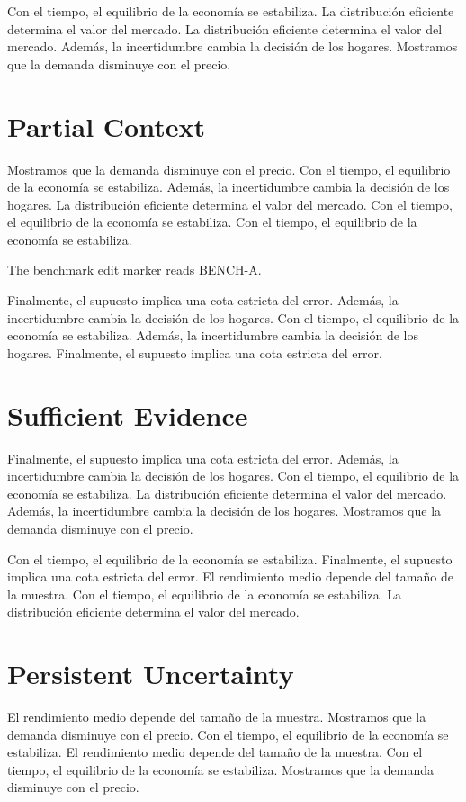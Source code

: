 \documentclass[11pt]{article}
\begin{document}
Con el tiempo, el equilibrio de la economía se estabiliza. La distribución eficiente determina el valor del mercado. La distribución eficiente determina el valor del mercado. Además, la incertidumbre cambia la decisión de los hogares. Mostramos que la demanda disminuye con el precio.

\section{Partial Context}\label{sec:4}

Mostramos que la demanda disminuye con el precio. Con el tiempo, el equilibrio de la economía se estabiliza. Además, la incertidumbre cambia la decisión de los hogares. La distribución eficiente determina el valor del mercado. Con el tiempo, el equilibrio de la economía se estabiliza. Con el tiempo, el equilibrio de la economía se estabiliza.

The benchmark edit marker reads BENCH-A.

Finalmente, el supuesto implica una cota estricta del error. Además, la incertidumbre cambia la decisión de los hogares. Con el tiempo, el equilibrio de la economía se estabiliza. Además, la incertidumbre cambia la decisión de los hogares. Finalmente, el supuesto implica una cota estricta del error.

\section{Sufficient Evidence}\label{sec:5}

Finalmente, el supuesto implica una cota estricta del error. Además, la incertidumbre cambia la decisión de los hogares. Con el tiempo, el equilibrio de la economía se estabiliza. La distribución eficiente determina el valor del mercado. Además, la incertidumbre cambia la decisión de los hogares. Mostramos que la demanda disminuye con el precio.

Con el tiempo, el equilibrio de la economía se estabiliza. Finalmente, el supuesto implica una cota estricta del error. El rendimiento medio depende del tamaño de la muestra. Con el tiempo, el equilibrio de la economía se estabiliza. La distribución eficiente determina el valor del mercado.

\section{Persistent Uncertainty}\label{sec:6}

El rendimiento medio depende del tamaño de la muestra. Mostramos que la demanda disminuye con el precio. Con el tiempo, el equilibrio de la economía se estabiliza. El rendimiento medio depende del tamaño de la muestra. Con el tiempo, el equilibrio de la economía se estabiliza. Mostramos que la demanda disminuye con el precio.
\end{document}
